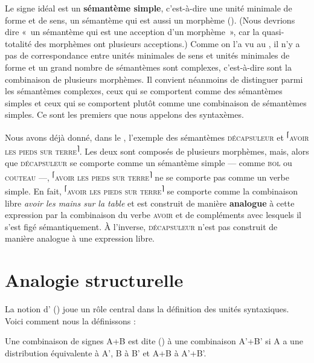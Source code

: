 Le signe idéal est un \textbf{sémantème simple}, c’est-à-dire une unité minimale de forme et de sens, un sémantème qui est aussi un morphème (). (Nous devrions dire «~un sémantème qui est une acception d’un morphème~», car la quasi-totalité des morphèmes ont plusieurs acceptions.) Comme on l’a vu au , il n’y a pas de correspondance entre unités minimales de sens et unités minimales de forme et un grand nombre de sémantèmes sont complexes, c’est-à-dire sont la combinaison de plusieurs morphèmes. Il convient néanmoins de distinguer parmi les sémantèmes complexes, ceux qui se comportent comme des sémantèmes simples et ceux qui se comportent plutôt comme une combinaison de sémantèmes simples. Ce sont les premiers que nous appelons des syntaxèmes.

Nous avons déjà donné, dans le , l’exemple des sémantèmes \textsc{décapsuleur} et \textsuperscript{⌈}\textsc{avoir} \textsc{les} \textsc{pieds} \textsc{sur} \textsc{terre}\textsuperscript{⌉}. Les deux sont composés de plusieurs morphèmes, mais, alors que \textsc{décapsuleur} se comporte comme un sémantème simple — comme \textsc{bol} ou \textsc{couteau} —, \textsuperscript{⌈}\textsc{avoir} \textsc{les} \textsc{pieds} \textsc{sur} \textsc{terre}\textsuperscript{⌉} ne se comporte pas comme un verbe simple. En fait, \textsuperscript{⌈}\textsc{avoir} \textsc{les} \textsc{pieds} \textsc{sur} \textsc{terre}\textsuperscript{⌉} se comporte comme la combinaison libre \textit{avoir les mains sur la table} et est construit de manière \textbf{analogue} à cette expression par la combinaison du verbe \textsc{avoir} et de compléments avec lesquels il s’est figé sémantiquement. À l’inverse, \textsc{décapsuleur} n’est pas construit de manière analogue à une expression libre.

\section{Analogie structurelle}\label{sec:3.1.2}

La notion d’ () joue un rôle central dans la définition des unités syntaxiques. Voici comment nous la définissons :

\begin{styleLivreImportant}
Une combinaison de signes A+B est dite ()  à une combinaison A’+B’ si A a une distribution équivalente à A’, B à B’ et A+B à A’+B’.
\end{styleLivreImportant}

